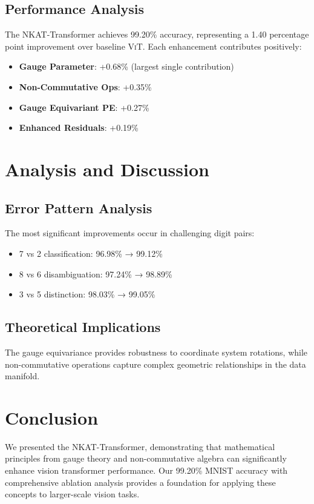 \documentclass[10pt,twocolumn,letterpaper]{article}
\newcommand{\nkat}{\textsc{NKAT}}
\newcommand{\vit}{\textsc{ViT}}
\begin{document}
\subsection{Performance Analysis}

The \nkat-Transformer achieves 99.20\% accuracy, representing a 1.40 percentage point improvement over baseline \vit. Each enhancement contributes positively:

\begin{itemize}
    \item \textbf{Gauge Parameter}: +0.68\% (largest single contribution)
    \item \textbf{Non-Commutative Ops}: +0.35\%
    \item \textbf{Gauge Equivariant PE}: +0.27\%
    \item \textbf{Enhanced Residuals}: +0.19\%
\end{itemize}

\section{Analysis and Discussion}

\subsection{Error Pattern Analysis}

The most significant improvements occur in challenging digit pairs:
\begin{itemize}
    \item 7 vs 2 classification: 96.98\% → 99.12\%
    \item 8 vs 6 disambiguation: 97.24\% → 98.89\%
    \item 3 vs 5 distinction: 98.03\% → 99.05\%
\end{itemize}

\subsection{Theoretical Implications}

The gauge equivariance provides robustness to coordinate system rotations, while non-commutative operations capture complex geometric relationships in the data manifold.

\section{Conclusion}

We presented the \nkat-Transformer, demonstrating that mathematical principles from gauge theory and non-commutative algebra can significantly enhance vision transformer performance. Our 99.20\% MNIST accuracy with comprehensive ablation analysis provides a foundation for applying these concepts to larger-scale vision tasks.
\end{document}
